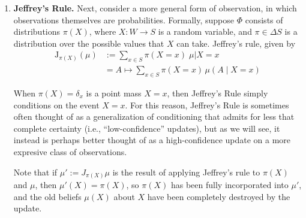 \begin{enumerate}
	\item \textbf{Jeffrey's Rule.}
	Next, consider a more general form of observation, in which observations themselves are probabilities.
	Formally, suppose $\Phi$ consists of distributions $\pi(X)$,
	where $X : W \to S$ is a random variable,
	and $\pi \in \Delta S$ is a distribution over the possible values that $X$ can take.
	Jeffrey's rule, given by
	\begin{align*}
		\mathrm{J}_{\pi(X)}
		(\mu) &:= \sum_{x \in S} \pi(X{=}x) \;  \mu \big|
            X{=}x
			\\
			&= A \mapsto \sum_{x \in S} \pi(X{=}x)\, \mu( A \mid X \!= x)
	\end{align*}

	When $\pi(X) = \delta_x$ is a point mass $X=x$, then Jeffrey's Rule simply conditions on the event $X = x$.
	For this reason, Jeffrey's Rule is sometimes often thought of as a generalization of conditioning that admits for less that complete certainty (i.e., ``low-confidence'' updates), but as we will see, it instead is perhaps better thought of as a high-confidence update on a more expresive class of observations.

	Note that if $\mu' := J_{\pi(X)}\mu$ is the result of applying Jeffrey's rule to $\pi(X)$ and $\mu$,
	then $\mu'(X) = \pi(X)$, so $\pi(X)$ has been fully incorporated into $\mu'$, and the old beliefs $\mu(X)$ about $X$ have been completely destroyed by the update.
\end{enumerate}
